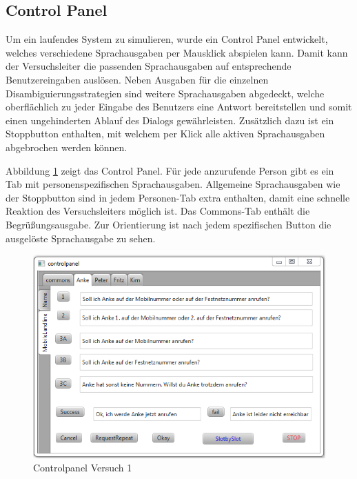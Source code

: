 \documentclass[12pt,a4paper]{scrartcl}
\begin{document}
\subsection{Control Panel}
\label{ControlPanel}
Um ein laufendes System zu simulieren, wurde ein Control Panel entwickelt, welches verschiedene Sprachausgaben per Mausklick abspielen kann. Damit kann der Versuchsleiter die passenden Sprachausgaben auf entsprechende Benutzereingaben auslösen. Neben Ausgaben für die einzelnen Disambiguierungsstrategien sind weitere Sprachausgaben abgedeckt, welche oberflächlich zu jeder Eingabe des Benutzers eine Antwort bereitstellen und somit einen ungehinderten Ablauf des Dialogs gewährleisten. Zusätzlich dazu ist ein Stoppbutton enthalten, mit welchem per Klick alle aktiven Sprachausgaben abgebrochen werden können. 

Abbildung \ref{cp1} zeigt das Control Panel. Für jede anzurufende Person gibt es ein Tab mit personenspezifischen Sprachausgaben. Allgemeine Sprachausgaben wie der Stoppbutton sind in jedem Personen-Tab extra enthalten, damit eine schnelle Reaktion des Versuchsleiters möglich ist. Das Commons-Tab enthält die Begrüßungsausgabe. Zur Orientierung ist nach jedem spezifischen Button die ausgelöste Sprachausgabe zu sehen. 
\begin{figure}[htbp]
\includegraphics[width=13cm]{controlpanel.png}
\caption{Controlpanel Versuch 1}
\label{cp1}
\end{figure}
\end{document}
